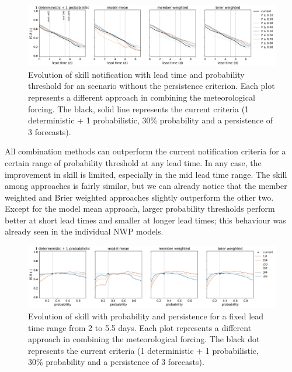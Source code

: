 \documentclass[preprint,12pt]{elsarticle}
\begin{document}
\begin{figure}
    \centering
    \includegraphics[width=1\textwidth]{figures/skill_probability_leadtime_1-1_COMB.jpg}
    \caption{Evolution of skill notification with lead time and probability threshold for an scenario without the persistence criterion. Each plot represents a different approach in combining the meteorological forcing. The black, solid line represents the current criteria (1 deterministic + 1 probabilistic, 30\% probability and a persistence of 3 forecasts).}
    \label{fig:COMB_skill_leadtime}
\end{figure}

All combination methods can outperform the current notification criteria for a certain range of probability threshold at any lead time. In any case, the improvement in skill is limited, especially in the mid lead time range. The skill among approaches is fairly similar, but we can already notice that the member weighted  and Brier weighted  approaches slightly outperform the other two. Except for the model mean  approach, larger probability thresholds perform better at short lead times and smaller at longer lead times; this behaviour was already seen in the individual NWP models.

\begin{figure}
    \centering
    \includegraphics[width=1\textwidth]{figures/skill_persistence_probability_060h_COMB.jpg}
    \caption{Evolution of skill with probability and persistence for a fixed lead time range from 2 to 5.5 days. Each plot represents a different approach in combining the meteorological forcing. The black dot represents the current criteria (1 deterministic + 1 probabilistic, 30\% probability and a persistence of 3 forecasts).}
    \label{fig:COMB_skill_probability}
\end{figure}
\end{document}
